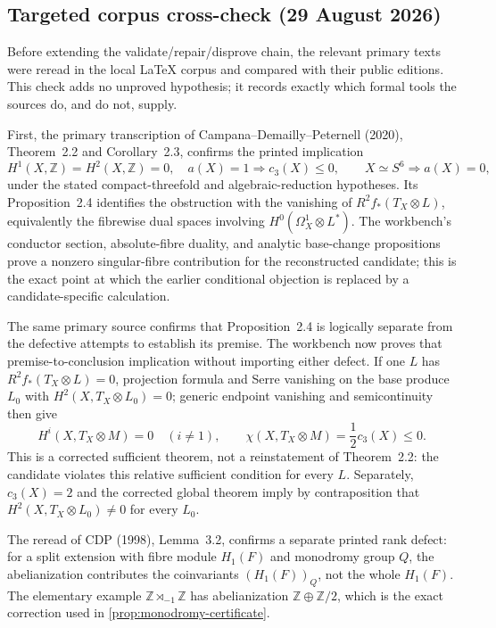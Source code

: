 \subsection{Targeted corpus cross-check (29 August 2026)}

Before extending the validate/repair/disprove chain, the relevant primary
texts were reread in the local LaTeX corpus and compared with their public
editions.  This check adds no unproved hypothesis; it records exactly which
formal tools the sources do, and do not, supply.

First, the primary transcription of Campana--Demailly--Peternell (2020),
Theorem~2.2 and Corollary~2.3, confirms the printed implication
\[
 H^1(X,\mathbb Z)=H^2(X,\mathbb Z)=0,\quad a(X)=1
 \Longrightarrow c_3(X)\leq 0,
 \qquad X\simeq S^6\Longrightarrow a(X)=0,
\]
under the stated compact-threefold and algebraic-reduction hypotheses.  Its
Proposition~2.4 identifies the obstruction with the vanishing of
$R^2f_*(T_X\otimes L)$, equivalently the fibrewise dual spaces involving
$H^0(\Omega_X^1\otimes L^*)$.  The workbench's conductor section,
absolute-fibre duality, and analytic base-change propositions prove a
nonzero singular-fibre contribution for the reconstructed candidate; this is
the exact point at which the earlier conditional objection is replaced by a
candidate-specific calculation.

The same primary source confirms that Proposition~2.4 is logically separate
from the defective attempts to establish its premise.  The workbench now
proves that premise-to-conclusion implication without importing either
defect.  If one \(L\) has
\(R^2f_*(T_X\otimes L)=0\), projection formula and Serre vanishing on the
base produce \(L_0\) with \(H^2(X,T_X\otimes L_0)=0\); generic endpoint
vanishing and semicontinuity then give
\[
 H^i(X,T_X\otimes M)=0\quad(i\ne1),\qquad
 \chi(X,T_X\otimes M)=\frac12c_3(X)\le0.
\]
This is a corrected sufficient theorem, not a reinstatement of Theorem~2.2:
the candidate violates this relative sufficient condition for every \(L\).
Separately, \(c_3(X)=2\) and the corrected global theorem imply by
contraposition that \(H^2(X,T_X\otimes L_0)\ne0\) for every \(L_0\).

The reread of CDP (1998), Lemma~3.2, confirms a separate printed rank defect:
for a split extension with fibre module $H_1(F)$ and monodromy group $Q$, the
abelianization contributes the coinvariants $(H_1(F))_Q$, not the whole
$H_1(F)$.  The elementary example
$\mathbb Z\rtimes_{-1}\mathbb Z$ has abelianization
$\mathbb Z\oplus\mathbb Z/2$, which is the exact correction used in
\cref{prop:monodromy-certificate}.

